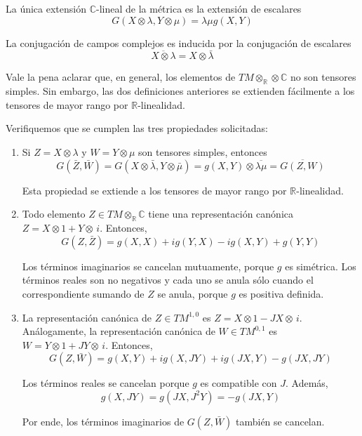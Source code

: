 \begin{solution}
La única extensión $\mathbb C$-lineal de la métrica es la extensión de escalares
$$G(X \otimes \lambda, Y \otimes \mu) = \lambda \mu g(X,Y)$$

La conjugación de campos complejos es inducida por la conjugación de escalares
$$\overline {X \otimes \lambda} = X \otimes \bar \lambda$$

Vale la pena aclarar que, en general, los elementos de $TM \otimes_\mathbb R \otimes \mathbb C$ no son tensores simples. Sin embargo, las dos definiciones anteriores se extienden fácilmente a los tensores de mayor rango por $\mathbb R$-linealidad.

Verifiquemos que se cumplen las tres propiedades solicitadas:
\begin{enumerate}
    \item Si $Z = X \otimes \lambda$ y $W = Y \otimes \mu$ son tensores simples, entonces
    $$G(\bar Z, \bar W) = G(X \otimes \bar \lambda, Y \otimes \bar \mu) = g(X,Y) \otimes \overline {\lambda \mu} = \overline {G(Z,W)}$$
    
    Esta propiedad se extiende a los tensores de mayor rango por $\mathbb R$-linealidad.
    
    \item Todo elemento $Z \in TM \otimes_\mathbb R \mathbb C$ tiene una representación canónica $Z = X \otimes 1 + Y \otimes \, i$. Entonces,
    $$G(Z, \bar Z) = g(X,X) + ig(Y,X) - ig(X,Y) + g(Y,Y)$$
    
    Los términos imaginarios se cancelan mutuamente, porque $g$ es simétrica. Los términos reales son no negativos y cada uno se anula sólo cuando el correspondiente sumando de $Z$ se anula, porque $g$ es positiva definida.
    
    \item La representación canónica de $Z \in TM^{1,0}$ es $Z = X \otimes 1 - JX \otimes \, i$. Análogamente, la representación canónica de $W \in TM^{0,1}$ es $W = Y \otimes 1 + JY \otimes \, i$. Entonces,
    $$G(Z, \bar W) = g(X,Y) + ig(X,JY) + ig(JX,Y) - g(JX,JY)$$
    
    Los términos reales se cancelan porque $g$ es compatible con $J$. Además,
    $$g(X,JY) = g(JX,J^2Y) = -g(JX,Y)$$
    
    Por ende, los términos imaginarios de $G(Z, \bar W)$ también se cancelan.
\end{enumerate}
\end{solution}
